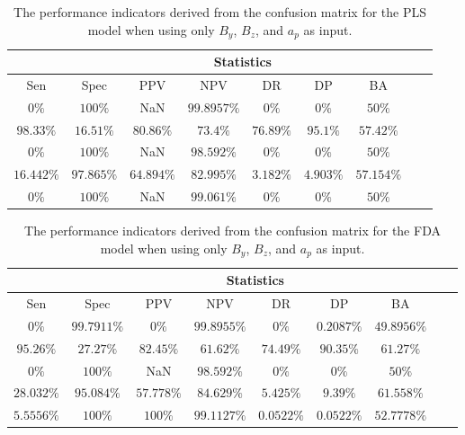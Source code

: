 \begin{table}[!ht]
	\centering
	\begin{tabular}{|c|c|c|c|c|c|c|c|c|}
		\hline
		 & \multicolumn{7}{c|}{Statistics} \\ \hline
		Sen & Spec & PPV & NPV & DR & DP & BA \\ \hline
		$0\%$ & $100\%$ & NaN & $99.8957\%$ & $0\%$ & $0\%$ & $50\%$ \\ \hline
		$98.33\%$ & $16.51\%$ & $80.86\%$ & $73.4\%$ & $76.89\%$ & $95.1\%$ & $57.42\%$ \\ \hline
		$0\%$ & $100\%$ & NaN & $98.592\%$ & $0\%$ & $0\%$ & $50\%$ \\ \hline
		$16.442\%$ & $97.865\%$ & $64.894\%$ & $82.995\%$ & $3.182\%$ & $4.903\%$ & $57.154\%$ \\ \hline
		$0\%$ & $100\%$ & NaN & $99.061\%$ & $0\%$ & $0\%$ & $50\%$ \\ \hline
	\end{tabular}
	\caption{The performance indicators derived from the confusion matrix for the PLS model when using only $B_{y}$, $B_{z}$, and $a_{p}$ as input.}
	\label{tab:cs:yzap:pls}
\end{table}

\begin{table}[!ht]
	\centering
	\begin{tabular}{|c|c|c|c|c|c|c|c|c|}
		\hline
		 & \multicolumn{7}{c|}{Statistics} \\ \hline
		Sen & Spec & PPV & NPV & DR & DP & BA \\ \hline
		$0\%$ & $99.7911\%$ & $0\%$ & $99.8955\%$ & $0\%$ & $0.2087\%$ & $49.8956\%$ \\ \hline
		$95.26\%$ & $27.27\%$ & $82.45\%$ & $61.62\%$ & $74.49\%$ & $90.35\%$ & $61.27\%$ \\ \hline
		$0\%$ & $100\%$ & NaN & $98.592\%$ & $0\%$ & $0\%$ & $50\%$ \\ \hline
		$28.032\%$ & $95.084\%$ & $57.778\%$ & $84.629\%$ & $5.425\%$ & $9.39\%$ & $61.558\%$ \\ \hline
		$5.5556\%$ & $100\%$ & $100\%$ & $99.1127\%$ & $0.0522\%$ & $0.0522\%$ & $52.7778\%$ \\ \hline
	\end{tabular}
	\caption{The performance indicators derived from the confusion matrix for the FDA model when using only $B_{y}$, $B_{z}$, and $a_{p}$ as input.}
	\label{tab:cs:yzap:fda}
\end{table}


